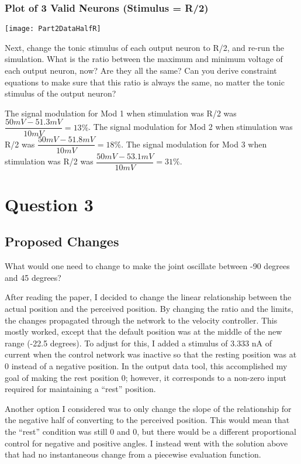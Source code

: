 \documentclass[12pt, letterpaper, oneside, notitlepage, onecolumn]{article}
\begin{document}
\subsubsection{Plot of 3 Valid Neurons (Stimulus = R/2)}

\texttt{[image: Part2DataHalfR]}

Next, change the tonic stimulus of each output neuron 
to R/2, and re-run the simulation. What is the ratio between the maximum and 
minimum voltage of each output neuron, now? Are they all the same? Can you 
derive constraint equations to make sure that this ratio is always the
same, no matter the tonic stimulus of the output neuron?

The signal modulation for Mod 1 when stimulation was R/2 was $\dfrac{50 mV - 51.3 mV}{10 mV} = 13\%$.
The signal modulation for Mod 2 when stimulation was R/2 was $\dfrac{50 mV - 51.8 mV}{10 mV} = 18\%$.
The signal modulation for Mod 3 when stimulation was R/2 was $\dfrac{50 mV - 53.1 mV}{10 mV} = 31\%$.

\section{Question 3}

\subsection{Proposed Changes}

What would one need to change to make the joint oscillate between -90 degrees and 45
degrees?

After reading the paper, I decided to change the linear relationship between the actual position and the perceived position. By changing the ratio and the limits, the changes propagated through the network to the velocity controller. This mostly worked, except that the default position was at the middle of the new range (-22.5 degrees). To adjust for this, I added a stimulus of 3.333 nA of current when the control network was inactive so that the resting position was at 0 instead of a negative position. In the output data tool, this accomplished my goal of making the rest position 0; however, it corresponds to a non-zero input required for maintaining a ``rest'' position.

Another option I considered was to only change the slope of the relationship for the negative half of converting to the perceived position. This would mean that the ``rest'' condition was still 0 and 0, but there would be a different proportional control for negative and positive angles. I instead went with the solution above that had no instantaneous change from a piecewise evaluation function.
\end{document}
